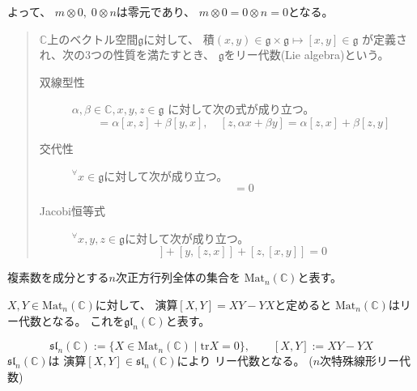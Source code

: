 \documentclass[12pt,b5paper]{ltjsarticle}
\begin{document}
よって、
$m\otimes 0,\; 0\otimes n$は零元であり、
$m\otimes 0 = 0\otimes n =0$となる。



\hrulefill

\begin{quotation}

 $\mathbb{C}$上のベクトル空間$\mathfrak{g}$に対して、
 積$(x,y)\in\mathfrak{g}\times\mathfrak{g}\mapsto [x,y]\in\mathfrak{g}$
 が定義され、次の3つの性質を満たすとき、
 $\mathfrak{g}$をリー代数(Lie algebra)という。
 \begin{description}
  \item[双線型性]
             $\alpha,\beta\in\mathbb{C}, x,y,z\in\mathfrak{g}$
             に対して次の式が成り立つ。
             \begin{equation}
              [\alpha x + \beta y, z] = \alpha[x,z]+\beta[y,x]
               ,\quad
               [z, \alpha x + \beta y] = \alpha[z,x]+\beta[z,y]
             \end{equation}

  \item[交代性]
             ${}^{\forall}x\in\mathfrak{g}$に対して次が成り立つ。
             \begin{equation}
              [x,x] = 0
             \end{equation}

  \item[Jacobi恒等式]
             ${}^{\forall}x,y,z\in\mathfrak{g}$に対して次が成り立つ。
             \begin{equation}
              [ x , [y,z]] + [ y , [z,x]] + [ z , [x,y]] =0
             \end{equation}
 \end{description}

\end{quotation}

複素数を成分とする$n$次正方行列全体の集合を
$\mathrm{Mat}_{n}(\mathbb{C})$と表す。

$X,Y \in \mathrm{Mat}_{n}(\mathbb{C})$に対して、
演算$[X,Y]=XY-YX$と定めると
$\mathrm{Mat}_{n}(\mathbb{C})$はリー代数となる。
これを$\mathfrak{gl}_{n}(\mathbb{C})$と表す。

\begin{equation}
 \mathfrak{sl}_{n}(\mathbb{C}) :=
  \{ X\in \mathrm{Mat}_{n}(\mathbb{C}) \mid \mathrm{tr}{X}=0 \}
  ,\qquad
  \left[ X,Y \right] := XY - YX
\end{equation}
$\mathfrak{sl}_{n}(\mathbb{C})$は
演算$[X,Y] \in \mathfrak{sl}_{n}(\mathbb{C})$により
リー代数となる。
($n$次特殊線形リー代数)
\end{document}
